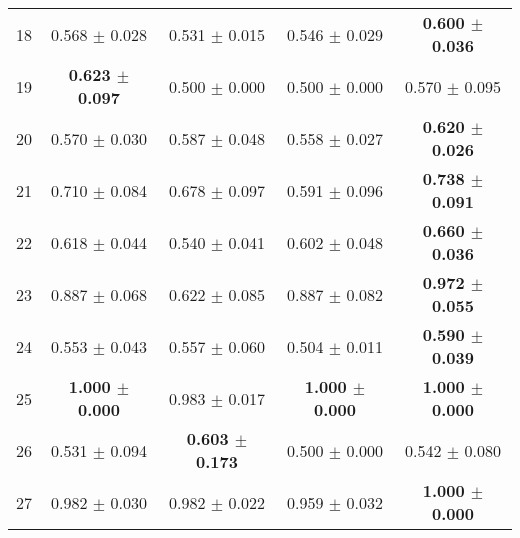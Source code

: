 \begin{table}[!ht]
{\begin{tabular}{r c c c c}
18 & 0.568 $\pm$ 0.028 & 0.531 $\pm$ 0.015 & 0.546 $\pm$ 0.029 & \textbf{0.600 $\pm$ 0.036} \\
19 & \textbf{0.623 $\pm$ 0.097} & 0.500 $\pm$ 0.000 & 0.500 $\pm$ 0.000 & 0.570 $\pm$ 0.095 \\
20 & 0.570 $\pm$ 0.030 & 0.587 $\pm$ 0.048 & 0.558 $\pm$ 0.027 & \textbf{0.620 $\pm$ 0.026} \\
21 & 0.710 $\pm$ 0.084 & 0.678 $\pm$ 0.097 & 0.591 $\pm$ 0.096 & \textbf{0.738 $\pm$ 0.091} \\
22 & 0.618 $\pm$ 0.044 & 0.540 $\pm$ 0.041 & 0.602 $\pm$ 0.048 & \textbf{0.660 $\pm$ 0.036} \\
23 & 0.887 $\pm$ 0.068 & 0.622 $\pm$ 0.085 & 0.887 $\pm$ 0.082 & \textbf{0.972 $\pm$ 0.055} \\
24 & 0.553 $\pm$ 0.043 & 0.557 $\pm$ 0.060 & 0.504 $\pm$ 0.011 & \textbf{0.590 $\pm$ 0.039} \\
25 & \textbf{1.000 $\pm$ 0.000} & 0.983 $\pm$ 0.017 & \textbf{1.000 $\pm$ 0.000} & \textbf{1.000 $\pm$ 0.000} \\
26 & 0.531 $\pm$ 0.094 & \textbf{0.603 $\pm$ 0.173} & 0.500 $\pm$ 0.000 & 0.542 $\pm$ 0.080 \\
27 & 0.982 $\pm$ 0.030 & 0.982 $\pm$ 0.022 & 0.959 $\pm$ 0.032 & \textbf{1.000 $\pm$ 0.000} \\
\end{tabular}}
\end{table}
